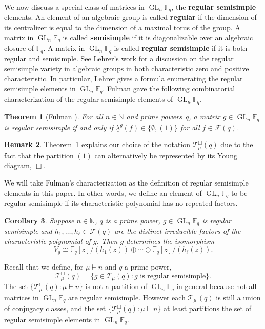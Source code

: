 \documentclass[10pt]{article}
\newtheorem{theorem}{Theorem}[section]
\newtheorem{corollary}[theorem]{Corollary}
\theoremstyle{definition}
\newtheorem{remark}[theorem]{Remark}
\DeclareMathOperator{\GL}{GL}
\newcommand{\F}{\mathbb{F}}
\newcommand{\CF}{\mathcal{F}}
\newcommand{\N}{\mathbb{N}}
\newcommand{\CT}{\mathcal{T}}
\newcommand{\myemph}{\textbf}
\newcommand{\ulambda}{{\underline{\lambda}}}
\begin{document}
We now discuss a special class of matrices in $\GL_n \F_q$, the \myemph{regular semisimple} elements.
An element of an algebraic group is called \myemph{regular} if the dimension of its centralizer is equal to the dimension of a maximal torus of the group.
A matrix in $\GL_n \F_q$ is called \myemph{semisimple} if it is diagonalizable over an algebraic closure of $\F_q$.
A matrix in $\GL_n \F_q$ is called \myemph{regular semisimple} if it is both regular and semisimple.
See Lehrer's work \cite{lehrer} for a discussion on the regular semisimple variety in algebraic groups in both characteristic zero and positive characteristic.
In particular, Lehrer gives a formula \cite[Corollary~8.5]{lehrer} enumerating the regular semisimple elements in \(\GL_n \F_q\).
Fulman gave the following combinatorial characterization of the regular semisimple elements of $\GL_n \F_q$.

\begin{theorem}[Fulman \cite{fulman}]
\label{fulmans_characterization}
For all \(n \in \N\) and prime powers~\(q\), a matrix $g \in \GL_n \F_q$ is regular semisimple if and only if $\ulambda^g (f) \in \{\emptyset, (1)\}$ for all $f \in \CF (q)$.
\end{theorem}

\begin{remark}
	Theorem~\ref{fulmans_characterization} explains our choice of the notation \(\CT^\Box_\mu (q)\) due to the fact that the partition \((1)\) can alternatively be represented by its Young diagram, \(\Box\).
\end{remark}

We will take Fulman's characterization as the definition of regular semisimple elements in this paper.
In other words, we define an element of \(\GL_n \F_q\) to be regular semisimple if its characteristic polynomial has no repeated factors.

\begin{corollary}
\label{rs_rcf_corollary}
Suppose \(n \in \N\), \(q\) is a prime power, \(g \in \GL_n \F_q\) is regular semisimple and \(h_1,\ldots,h_\ell \in \CF (q)\) are the distinct irreducible factors of the characteristic polynomial of \(g\).
Then \(g\) determines the isomorphism
\begin{equation}
\label{rs_rcf}
V_g \cong
{\F_q[z]} / {(h_1(z))}
\oplus
\cdots
\oplus
{\F_q[z]} / {(h_{\ell} (z))}.
\end{equation}
\end{corollary}


Recall that we define, for \(\mu \vdash n\) and \(q\) a prime power,
\begin{equation}
\CT^\Box_\mu (q)
=
\{g \in \CT_\mu (q) : g \text{ is regular semisimple}\}.
\end{equation}
The set $\{ \CT_\mu^\Box (q) : \mu \vdash n \}$ is not a partition of $\GL_n \F_q$ in general because not all matrices in $\GL_n \F_q$ are regular semisimple.
However each $\CT^\Box_\mu (q)$ is still a union of conjugacy classes, and the set $\{\CT^\Box_\mu (q) : \mu \vdash n\}$ at least partitions the set of regular semisimple elements in $\GL_n \F_q$.
\end{document}
